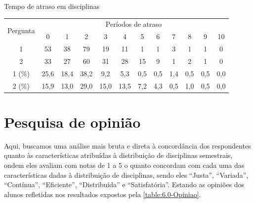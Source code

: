 \begin{apendicesenv}
  \begin{CenteredTable} \caption{Tempo de atraso em disciplinas} \label{table:5.0-Atrasos}
    \begin{tabular}{| c | c c c c c c c c c c c |}
      \hline
      \multicolumn{1}{|c|}{\multirow{2}{*}{Pergunta}} &
      \multicolumn{11}{c|}{Períodos de atraso}                                                                               \\
      \multicolumn{1}{|c|}{}                          &
      \multicolumn{1}{c|}{0}                          &
      \multicolumn{1}{c|}{1}                          &
      \multicolumn{1}{c|}{2}                          &
      \multicolumn{1}{c|}{3}                          &
      \multicolumn{1}{c|}{4}                          &
      \multicolumn{1}{c|}{5}                          &
      \multicolumn{1}{c|}{6}                          &
      \multicolumn{1}{c|}{7}                          &
      \multicolumn{1}{c|}{8}                          &
      \multicolumn{1}{c|}{9}                          &
      \multicolumn{1}{|c|}{10}
      \\
      \hline
      1                                               & 53   & 38   & 79   & 19   & 11   & 1   & 1   & 3   & 1   & 1   & 0   \\
      2                                               & 33   & 27   & 60   & 31   & 28   & 15  & 9   & 1   & 2   & 1   & 0   \\
      \hline
      1 (\%)                                          & 25,6 & 18,4 & 38,2 & 9,2  & 5,3  & 0,5 & 0,5 & 1,4 & 0,5 & 0,5 & 0,0 \\
      2 (\%)                                          & 15,9 & 13,0 & 29,0 & 15,0 & 13,5 & 7,2 & 4,3 & 0,5 & 1,0 & 0,5 & 0,0 \\
      \hline
    \end{tabular}
  \end{CenteredTable}

  \section*{Pesquisa de opinião} \label{sec:Pesquisa de opinião}

  Aqui, buscamos uma análise mais bruta e direta à concordância dos respondentes quanto às características atribuídas à distribuição de disciplinas semestrais, ondem eles avaliam com notas de 1 a 5 o quanto concordam com cada uma das características dadas à distribuição de disciplinas, sendo eles ``Justa'', ``Variada'', ``Contínua'', ``Eficiente'', ``Distribuída'' e ``Satisfatória''. Estando as opiniões dos alunos refletidas nos resultados expostos pela \autoref{table:6.0-Opiniao}.


\end{apendicesenv}
